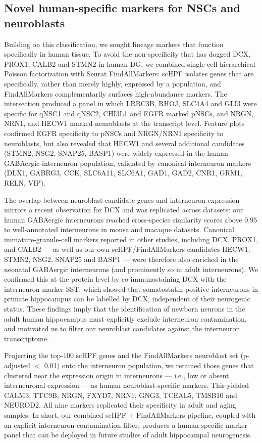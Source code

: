 \documentclass[11pt]{article}
\begin{document}
\subsection{Novel human-specific markers for NSCs and neuroblasts}

Building on this classification, we sought lineage markers that function
specifically in human tissue. To avoid the non-specificity that has dogged
DCX, PROX1, CALB2 and STMN2 in human DG, we combined single-cell
hierarchical Poisson factorization \cite{levitin2019gene} with Seurat
FindAllMarkers: scHPF isolates genes that are specifically, rather than
merely highly, expressed by a population, and FindAllMarkers
complementarily surfaces high-abundance markers. The intersection produced
a panel in which LRRC3B, RHOJ, SLC4A4 and GLI3 were specific for qNSC1 and
qNSC2, CHI3L1 and EGFR marked pNSCs, and NRGN, NRN1, and HECW1 marked
neuroblasts at the transcript level. Feature plots confirmed EGFR
specificity to pNSCs and NRGN/NRN1 specificity to neuroblasts, but also
revealed that HECW1 and several additional candidates (STMN2, NSG2, SNAP25,
BASP1) were widely expressed in the human GABAergic-interneuron population,
validated by canonical interneuron markers (DLX1, GABRG3, CCK, SLC6A11,
SLC6A1, GAD1, GAD2, CNR1, GRM1, RELN, VIP).

The overlap between neuroblast-candidate genes and interneuron expression
mirrors a recent observation for DCX \cite{franjic2022transcriptomic} and
was replicated across datasets: our human GABAergic interneurons reached
cross-species similarity scores above 0.95 to well-annotated interneurons
in mouse and macaque datasets. Canonical immature-granule-cell markers
reported in other studies, including DCX, PROX1, and CALB2 --- as well as
our own scHPF/FindAllMarkers candidates HECW1, STMN2, NSG2, SNAP25 and
BASP1 --- were therefore also enriched in the neonatal GABAergic
interneurons (and prominently so in adult interneurons). We confirmed this
at the protein level by co-immunostaining DCX with the interneuron marker
SST, which showed that somatostatin-positive interneurons in primate
hippocampus can be labelled by DCX, independent of their neurogenic
status. These findings imply that the identification of newborn neurons
in the adult human hippocampus must explicitly exclude interneuron
contamination, and motivated us to filter our neuroblast candidates
against the interneuron transcriptome.

Projecting the top-100 scHPF genes and the FindAllMarkers neuroblast set
(p-adjusted $<$ 0.01) onto the interneuron population, we retained those
genes that clustered near the expression origin in interneurons --- i.e.,
low or absent interneuronal expression --- as human neuroblast-specific
markers. This yielded CALM3, TTC9B, NRGN, FXYD7, NRN1, GNG3, TCEAL5,
TMSB10 and NEUROD2. All nine markers replicated their specificity in
adult and aging samples. In short, our combined scHPF $+$ FindAllMarkers
pipeline, coupled with an explicit interneuron-contamination filter,
produces a human-specific marker panel that can be deployed in future
studies of adult hippocampal neurogenesis.
\end{document}
